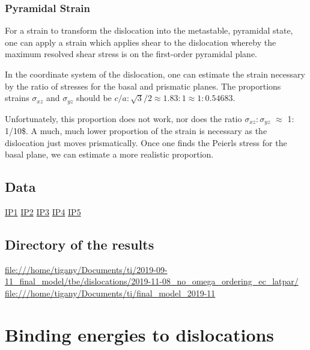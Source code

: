 \documentclass[11pt]{article}
\begin{document}
\subsubsection{Pyramidal Strain}
\label{sec:org1ef7bc0}

For a strain to transform the dislocation into the metastable,
pyramidal state, one can apply a strain which applies shear to the
dislocation whereby the maximum resolved shear stress is on the
first-order pyramidal plane. 

In the coordinate system of the dislocation, one can estimate the strain necessary by the ratio
of stresses for the basal and prismatic planes. The proportions strains \(\sigma_{xz}\) and
\(\sigma_{yz}\) should be \(c/a : \sqrt{3}/2 \approx 1.83 : 1 \approx 1 : 0.54683\).

Unfortunately, this proportion does not work, nor does the ratio \(\sigma_{xz}:\sigma_{yz}\)
\(\approx\) 1: 1/10\$. A much, much lower proportion of the strain is
necessary as the dislocation just moves prismatically. Once one finds
the Peierls stress for the basal plane, we can estimate a more realistic proportion. 


\subsection{Data}
\label{sec:org194b373}
\href{file:///home/tigany/Documents/ti/final\_model\_2019-11-12/results\_2019-11-09\_muc/IP1-oo\_19-11-09--04-46-00.log}{IP1}
\href{file:///home/tigany/Documents/ti/final\_model\_2019-11-12/results\_2019-11-09\_muc/IP2-oo\_19-11-09--04-46-00.log}{IP2}
\href{file:///home/tigany/Documents/ti/final\_model\_2019-11-12/results\_2019-11-09\_muc/IP3-oo\_19-11-09--04-46-00.log}{IP3}
\href{file:///home/tigany/Documents/ti/final\_model\_2019-11-12/results\_2019-11-09\_muc/IP4-oo\_19-11-09--04-46-00.log}{IP4}
\href{file:///home/tigany/Documents/ti/final\_model\_2019-11-12/results\_2019-11-09\_muc/IP5-oo\_19-11-09--04-46-00.log}{IP5}

\subsection{Directory of the results}
\label{sec:org5f0080c}
\url{file:///home/tigany/Documents/ti/2019-09-11\_final\_model/tbe/dislocations/2019-11-08\_no\_omega\_ordering\_ec\_latpar/}
\url{file:///home/tigany/Documents/ti/final\_model\_2019-11}


\section{Binding energies to dislocations}
\label{sec:orgbedfd4b}
\end{document}
